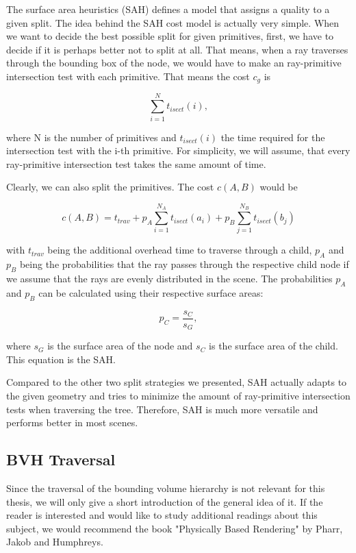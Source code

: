 The surface area heuristics (SAH) defines a model that assigns a quality to a given split. The idea behind the SAH cost model is actually very simple. When we want to decide the best possible split for given primitives, first, we have to decide if it is perhaps better not to split at all. That means, when a ray traverses through the bounding box of the node, we would have to make an ray-primitive intersection test with each primitive. That means the cost $c_g$ is 

\begin{equation}
\sum_{i = 1}^{N}t_{isect}(i),
\end{equation}

where N is the number of primitives and $t_{isect}(i)$ the time required for the intersection test with the i-th primitive. For simplicity, we will assume, that every ray-primitive intersection test takes the same amount of time.

Clearly, we can also split the primitives. The cost $c(A,B)$ would be

\begin{equation}
c(A,B) = t_{trav} + p_A\sum_{i=1}^{N_A}t_{isect}(a_i) + p_B\sum_{j=1}^{N_B}t_{isect}(b_j)
\end{equation}

with $t_{trav}$ being the additional overhead time to traverse through a child, $p_A$ and $p_B$ being the probabilities that the ray passes through the respective child node if we assume that the rays are evenly distributed in the scene. The probabilities $p_A$ and $p_B$ can be calculated using their respective surface areas:

\begin{equation}
p_C = \frac{s_C}{s_G},
\end{equation}

where $s_G$ is the surface area of the node and $s_C$ is the surface area of the child. This equation is the SAH.

Compared to the other two split strategies we presented, SAH actually adapts to the given geometry and tries to minimize the amount of ray-primitive intersection tests when traversing the tree. Therefore, SAH is much more versatile and performs better in most scenes.

\subsection{BVH Traversal}

Since the traversal of the bounding volume hierarchy is not relevant for this thesis, we will only give a short introduction of the general idea of it. If the reader is interested and would like to study additional readings about this subject, we would recommend the book "Physically Based Rendering" by Pharr, Jakob and Humphreys. \Cite{PBR}

